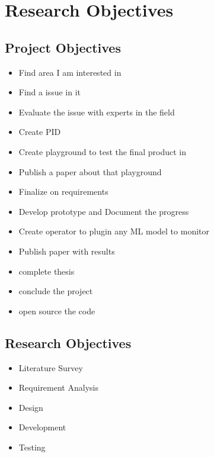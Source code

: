 \section{Research Objectives}

\subsection{Project Objectives}
\begin{itemize}
\item Find area I am interested in
\item Find a issue in it
\item Evaluate the issue with experts in the field
\item Create PID
\item Create playground to test the final product in
\item Publish a paper about that playground
\item Finalize on requirements
\item Develop prototype and Document the progress 
\item Create operator to plugin any ML model to monitor
\item Publish paper with results
\item complete thesis
\item conclude the project
\item open source the code
\end{itemize}

\subsection{Research Objectives}
\begin{itemize}
\item Literature Survey
\item Requirement Analysis
\item Design
\item Development
\item Testing
\end{itemize}
